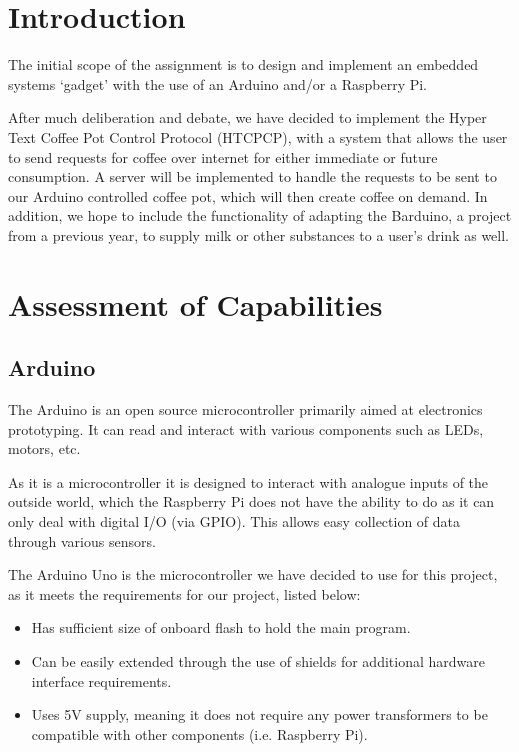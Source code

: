\documentclass[12pt, a4paper]{article}
\begin{document}

\section{Introduction}
The initial scope of the assignment is to design and implement an embedded
systems ‘gadget’ with the use of an Arduino and/or a Raspberry Pi.

After much deliberation and debate, we have decided to implement the Hyper Text 
Coffee Pot Control Protocol (HTCPCP)\cite{HTCPCP}, with a system that allows
the user to send requests for coffee over  internet for either immediate or
future consumption. A server will be implemented to handle the requests to be
sent to our Arduino controlled coffee pot, which will then create coffee on
demand. In addition, we hope to include the functionality of adapting the
Barduino, a project from a previous year, to supply milk or other substances to
a user’s drink as well.
\newpage


\section{Assessment of Capabilities}
\subsection{Arduino}
The Arduino is an open source microcontroller primarily aimed at electronics
prototyping. It can read and interact with various components such as LEDs,
motors, etc.

As it is a microcontroller it is designed to interact with analogue inputs of
the outside world, which the Raspberry Pi does not have the ability to do as it
can only deal with digital I/O (via GPIO). This allows easy collection of data
through various sensors. 

The Arduino Uno is the microcontroller we have decided to use for this project,
as it meets the requirements for our project, listed below:

\begin{itemize}
	\item Has sufficient size of onboard flash to hold the main program.
	\item Can be easily extended through the use of shields for additional
	hardware interface requirements.
	\item Uses 5V supply, meaning it does not require any power transformers to
	be compatible with other components (i.e. Raspberry Pi).
\end{itemize}
\end{document}
